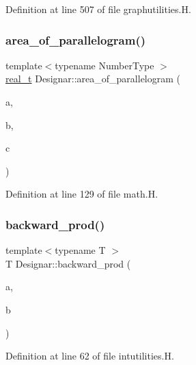 Definition at line 507 of file graphutilities.\+H.

\mbox{\label{namespace_designar_a0e768d9436448a70b1a1e2ec87b4d0ca}} 
\subsubsection{\texorpdfstring{area\+\_\+of\+\_\+parallelogram()}{area\_of\_parallelogram()}}
{\footnotesize\ttfamily template$<$typename Number\+Type $>$ \\
\hyperlink{namespace_designar_aca2c32af26808dbec1f3a3071fad25ce}{real\+\_\+t} Designar\+::area\+\_\+of\+\_\+parallelogram (\begin{DoxyParamCaption}\item[{const \hyperlink{class_designar_1_1_gen_point2_d}{Gen\+Point2D}$<$ Number\+Type $>$ \&}]{a,  }\item[{const \hyperlink{class_designar_1_1_gen_point2_d}{Gen\+Point2D}$<$ Number\+Type $>$ \&}]{b,  }\item[{const \hyperlink{class_designar_1_1_gen_point2_d}{Gen\+Point2D}$<$ Number\+Type $>$ \&}]{c }\end{DoxyParamCaption})}



Definition at line 129 of file math.\+H.

\mbox{\label{namespace_designar_aed558aafc7789fb59b2381d0894b51cb}} 
\subsubsection{\texorpdfstring{backward\+\_\+prod()}{backward\_prod()}}
{\footnotesize\ttfamily template$<$typename T $>$ \\
T Designar\+::backward\+\_\+prod (\begin{DoxyParamCaption}\item[{T}]{a,  }\item[{T}]{b }\end{DoxyParamCaption})}



Definition at line 62 of file intutilities.\+H.

